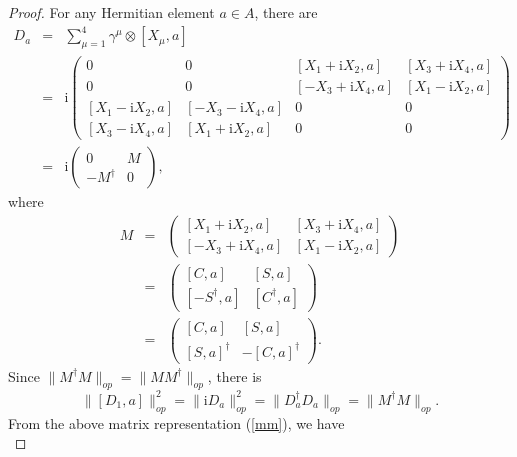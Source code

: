 \documentclass[a4paper,11pt]{article}
\begin{document}
\begin{proof}
  For any Hermitian element $a \in A$, there are
  \begin{eqnarray}\label{mm1}
    D_a & = & \sum_{\mu = 1}^4 \gamma^{\mu} \otimes [X_{\mu}, a] \nonumber\\
    & = & \mathrm{i} \left( \begin{array}{cccc}
      0 & 0 & [X_1 + \mathrm{i}X_2, a] & [X_3 + \mathrm{i}X_4, a]\\
      0 & 0 & [- X_3 + \mathrm{i}X_4, a] & [X_1 - \mathrm{i}X_2, a]\\
      {}[X_1 - \mathrm{i}X_2, a] & [- X_3 - \mathrm{i}X_4, a] & 0 & 0\\
      {}[X_3 - \mathrm{i}X_4, a] & [X_1 + \mathrm{i}X_2, a] & 0 & 0
    \end{array} \right) \nonumber\\
    & = & \mathrm{i} \left( \begin{array}{cc}
      0 & M\\
      - M^{\dag} & 0
    \end{array} \right), 
  \end{eqnarray}
  where
  \begin{eqnarray}\label{mm}
    M & = & \left( \begin{array}{cc}
      {}[X_1 + \mathrm{i}X_2, a] & [X_3 + \mathrm{i}X_4, a]\\
      {}[- X_3 + \mathrm{i}X_4, a] & [X_1 - \mathrm{i}X_2, a]
    \end{array} \right) \nonumber\\
    & = & \left( \begin{array}{cc}
      {}[C, a] & [S, a]\\
      {}[- S^{\dag}, a] & [C^{\dag}, a]
    \end{array} \right) \nonumber\\
    & = & \left( \begin{array}{cc}
      {}[C, a] & [S, a]\\
      {}[S, a]^{\dag} & - [C, a]^{\dag}
    \end{array} \right) . 
  \end{eqnarray}
  Since $\|M^{\dag} M\|_{op} = \|MM^{\dag} \|_{op}$, there is
  \begin{equation}\label{dam}
    \|[D_1, a]\|_{op}^2 =   \|\mathrm{i}D_a \|_{op}^2 =  
    \|D_a^{\dag} D_a \|_{op} = \|M^{\dag} M\|_{op} .
  \end{equation}
  From the above matrix representation (\ref{mm}), we have
  \begin{equation}

\end{equation}
\end{proof}
\end{document}
